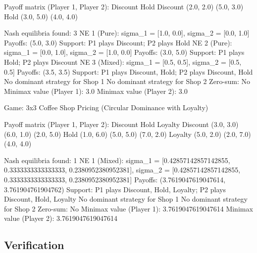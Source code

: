 \documentclass[11pt, a4paper]{article}
\begin{document}
Payoff matrix (Player 1, Player 2):
        Discount           Hold
    Discount      (2.0, 2.0)     (5.0, 3.0)
        Hold      (3.0, 5.0)     (4.0, 4.0)

Nash equilibria found: 3
  NE 1 (Pure): sigma\_1 = [1.0, 0.0], sigma\_2 = [0.0, 1.0]
    Payoffs: (5.0, 3.0)
    Support: P1 plays Discount; P2 plays Hold
  NE 2 (Pure): sigma\_1 = [0.0, 1.0], sigma\_2 = [1.0, 0.0]
    Payoffs: (3.0, 5.0)
    Support: P1 plays Hold; P2 plays Discount
  NE 3 (Mixed): sigma\_1 = [0.5, 0.5], sigma\_2 = [0.5, 0.5]
    Payoffs: (3.5, 3.5)
    Support: P1 plays Discount, Hold; P2 plays Discount, Hold
  No dominant strategy for Shop 1
  No dominant strategy for Shop 2
  Zero-sum: No
  Minimax value (Player 1): 3.0
  Minimax value (Player 2): 3.0

Game: 3x3 Coffee Shop Pricing (Circular Dominance with Loyalty)

Payoff matrix (Player 1, Player 2):
        Discount           Hold        Loyalty
    Discount      (3.0, 3.0)     (6.0, 1.0)     (2.0, 5.0)
        Hold      (1.0, 6.0)     (5.0, 5.0)     (7.0, 2.0)
     Loyalty      (5.0, 2.0)     (2.0, 7.0)     (4.0, 4.0)

Nash equilibria found: 1
  NE 1 (Mixed): sigma\_1 = [0.42857142857142855, 0.3333333333333333, 0.2380952380952381], sigma\_2 = [0.42857142857142855, 0.3333333333333333, 0.2380952380952381]
    Payoffs: (3.7619047619047614, 3.761904761904762)
    Support: P1 plays Discount, Hold, Loyalty; P2 plays Discount, Hold, Loyalty
  No dominant strategy for Shop 1
  No dominant strategy for Shop 2
  Zero-sum: No
  Minimax value (Player 1): 3.7619047619047614
  Minimax value (Player 2): 3.7619047619047614


\subsection{Verification}
\end{document}
